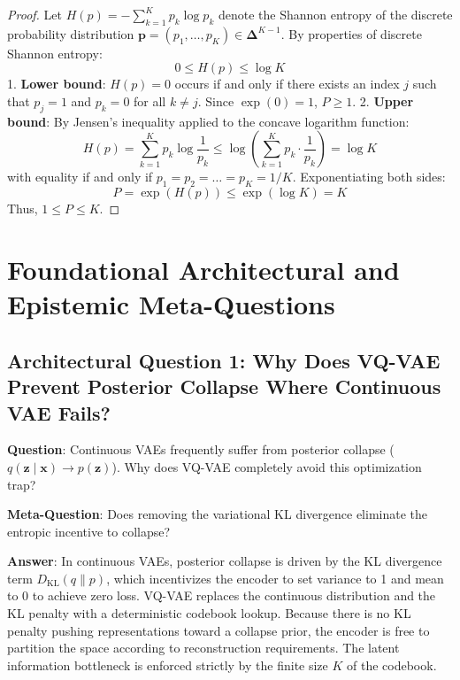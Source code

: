 \documentclass[11pt,a4paper]{article}
\theoremstyle{definition}
\begin{document}
\begin{proof}
Let $H(p) = -\sum_{k=1}^K p_k \log p_k$ denote the Shannon entropy of the discrete probability distribution $\mathbf{p} = (p_1, \dots, p_K) \in \boldsymbol{\Delta}^{K-1}$.
By properties of discrete Shannon entropy:
{\boldmath
\begin{equation}
0 \le H(p) \le \log K
\end{equation}
}
1. \textbf{Lower bound}: $H(p) = 0$ occurs if and only if there exists an index $j$ such that $p_j = 1$ and $p_k = 0$ for all $k \ne j$. Since $\exp(0) = 1$, $P \ge 1$.
2. \textbf{Upper bound}: By Jensen's inequality applied to the concave logarithm function:
{\boldmath
\begin{equation}
H(p) = \sum_{k=1}^K p_k \log \frac{1}{p_k} \le \log \left( \sum_{k=1}^K p_k \cdot \frac{1}{p_k} \right) = \log K
\end{equation}
}
with equality if and only if $p_1 = p_2 = \dots = p_K = 1/K$.
Exponentiating both sides:
{\boldmath
\begin{equation}
P = \exp(H(p)) \le \exp(\log K) = K
\end{equation}
}
Thus, $1 \le P \le K$.
\end{proof}

\section{Foundational Architectural and Epistemic Meta-Questions}

\subsection{Architectural Question 1: Why Does VQ-VAE Prevent Posterior Collapse Where Continuous VAE Fails?}
\textbf{Question}: Continuous VAEs frequently suffer from posterior collapse ($q(\mathbf{z} \mid \mathbf{x}) \to p(\mathbf{z})$). Why does VQ-VAE completely avoid this optimization trap?

\textbf{Meta-Question}: Does removing the variational KL divergence eliminate the entropic incentive to collapse?

\textbf{Answer}: In continuous VAEs, posterior collapse is driven by the KL divergence term $D_{\text{KL}}(q \parallel p)$, which incentivizes the encoder to set variance to 1 and mean to 0 to achieve zero loss. VQ-VAE replaces the continuous distribution and the KL penalty with a deterministic codebook lookup. Because there is no KL penalty pushing representations toward a collapse prior, the encoder is free to partition the space according to reconstruction requirements. The latent information bottleneck is enforced strictly by the finite size $K$ of the codebook.
\end{document}
